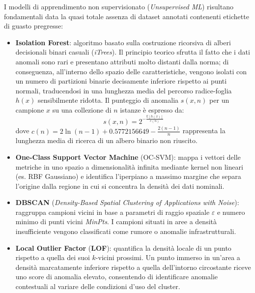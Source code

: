 \documentclass[11pt, a4paper]{article}
\begin{document}
I modelli di apprendimento non supervisionato (\emph{Unsupervised ML}) risultano fondamentali data la quasi totale assenza di dataset annotati contenenti etichette di guasto pregresse:
\begin{itemize}
    \item \textbf{Isolation Forest}: algoritmo basato sulla costruzione ricorsiva di alberi decisionali binari casuali (\emph{iTrees}). Il principio teorico sfrutta il fatto che i dati anomali sono rari e presentano attributi molto distanti dalla norma; di conseguenza, all'interno dello spazio delle caratteristiche, vengono isolati con un numero di partizioni binarie decisamente inferiore rispetto ai punti normali, traducendosi in una lunghezza media del percorso radice-foglia $h(x)$ sensibilmente ridotta. Il punteggio di anomalia $s(x, n)$ per un campione $x$ su una collezione di $n$ istanze è espresso da:
    \begin{equation}
        s(x, n) = 2^{-\frac{\mathbb{E}[h(x)]}{c(n)}}
    \end{equation}
    dove $c(n) = 2 \ln(n - 1) + 0.5772156649 - \frac{2(n - 1)}{n}$ rappresenta la lunghezza media di ricerca di un albero binario non riuscito.
    \item \textbf{One-Class Support Vector Machine} (OC-SVM): mappa i vettori delle metriche in uno spazio a dimensionalità infinita mediante kernel non lineari (es. RBF Gaussiano) e identifica l'iperpiano a massimo margine che separa l'origine dalla regione in cui si concentra la densità dei dati nominali.
    \item \textbf{DBSCAN} (\emph{Density-Based Spatial Clustering of Applications with Noise}): raggruppa campioni vicini in base a parametri di raggio spaziale $\varepsilon$ e numero minimo di punti vicini \emph{MinPts}. I campioni situati in aree a densità insufficiente vengono classificati come rumore o anomalie infrastrutturali.
    \item \textbf{Local Outlier Factor} (\textbf{LOF}): quantifica la densità locale di un punto rispetto a quella dei suoi $k$-vicini prossimi. Un punto immerso in un'area a densità marcatamente inferiore rispetto a quella dell'intorno circostante riceve uno score di anomalia elevato, consentendo di identificare anomalie contestuali al variare delle condizioni d'uso del cluster.
\end{itemize}

\end{document}
